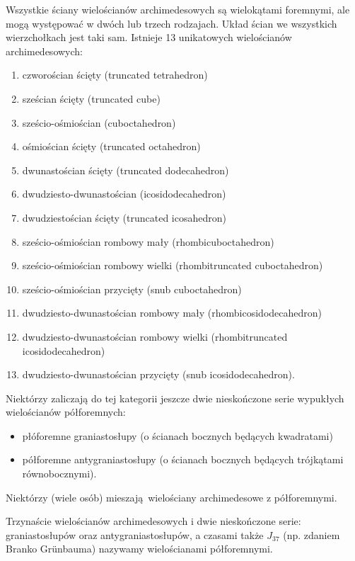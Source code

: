 

Wszystkie ściany wielościanów archimedesowych są wielokątami foremnymi, ale mogą występować w dwóch lub trzech rodzajach.
Układ ścian we wszystkich wierzchołkach jest taki sam.
Istnieje 13 unikatowych wielościanów archimedesowych:
\begin{enumerate}
\item czworościan ścięty (truncated tetrahedron)
\item sześcian ścięty (truncated cube)
\item sześcio-ośmiościan (cuboctahedron)
\item ośmiościan ścięty (truncated octahedron)
\item dwunastościan ścięty (truncated dodecahedron)
\item dwudziesto-dwunastościan (icosidodecahedron)
\item dwudziestościan ścięty (truncated icosahedron)
\item sześcio-ośmiościan rombowy mały (rhombicuboctahedron)
\item sześcio-ośmiościan rombowy wielki (rhombitruncated cuboctahedron)
\item sześcio-ośmiościan przycięty (snub cuboctahedron)
\item dwudziesto-dwunastościan rombowy mały (rhombicosidodecahedron)
\item dwudziesto-dwunastościan rombowy wielki (rhombitruncated icosidodecahedron)
\item dwudziesto-dwunastościan przycięty (snub icosidodecahedron).
\end{enumerate}
Niektórzy zaliczają do tej kategorii jeszcze dwie nieskończone serie wypukłych wielościanów półforemnych:
\begin{itemize}
\item płóforemne graniastosłupy (o ścianach bocznych będących kwadratami)
\item półforemne antygraniastosłupy (o ścianach bocznych będących trójkątami równobocznymi).
\end{itemize} 

Niektórzy (wiele osób) mieszają wielościany archimedesowe z półforemnymi.

\begin{definition}
    Trzynaście wielościanów archimedesowych i dwie nieskończone serie: graniastosłupów oraz antygraniastosłupów, a czasami także $J_{37}$ (np. zdaniem Branko Grünbauma) nazywamy wielościanami półforemnymi.
\end{definition}

